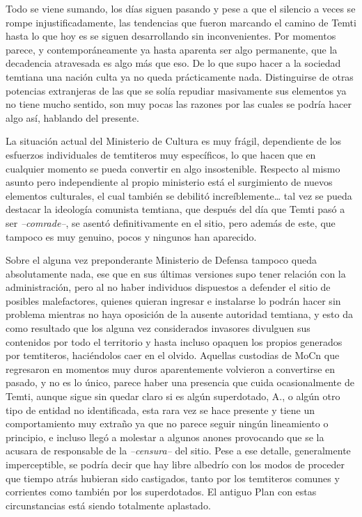 \documentclass[
  spanish,
]{book}
\begin{document}
Todo se viene sumando, los días siguen pasando y pese a que el silencio a veces se rompe injustificadamente, las tendencias que fueron marcando el camino de Temti hasta lo que hoy es se siguen desarrollando sin inconvenientes.
Por momentos parece, y contemporáneamente ya hasta aparenta ser algo permanente, que la decadencia atravesada es algo más que eso. De lo que supo hacer a la sociedad temtiana una nación culta ya no queda prácticamente nada. Distinguirse de otras potencias extranjeras de las que se solía repudiar masivamente sus elementos ya no tiene mucho sentido, son muy pocas las razones por las cuales se podría hacer algo así, hablando del presente.

La situación actual del Ministerio de Cultura es muy frágil, dependiente de los esfuerzos individuales de temtiteros muy específicos, lo que hacen que en cualquier momento se pueda convertir en algo insostenible. Respecto al mismo asunto pero independiente al propio ministerio está el surgimiento de nuevos elementos culturales, el cual también se debilitó increíblemente\ldots{} tal vez se pueda destacar la ideología comunista temtiana, que después del día que Temti pasó a ser \emph{--comrade--}, se asentó definitivamente en el sitio, pero además de este, que tampoco es muy genuino, pocos y ningunos han aparecido.

Sobre el alguna vez preponderante Ministerio de Defensa tampoco queda absolutamente nada, ese que en sus últimas versiones supo tener relación con la administración, pero al no haber individuos dispuestos a defender el sitio de posibles malefactores, quienes quieran ingresar e instalarse lo podrán hacer sin problema mientras no haya oposición de la ausente autoridad temtiana, y esto da como resultado que los alguna vez considerados invasores divulguen sus contenidos por todo el territorio y hasta incluso opaquen los propios generados por temtiteros, haciéndolos caer en el olvido. Aquellas custodias de MoCn que regresaron en momentos muy duros aparentemente volvieron a convertirse en pasado, y no es lo único, parece haber una presencia que cuida ocasionalmente de Temti, aunque sigue sin quedar claro si es algún superdotado, A., o algún otro tipo de entidad no identificada, esta rara vez se hace presente y tiene un comportamiento muy extraño ya que no parece seguir ningún lineamiento o principio, e incluso llegó a molestar a algunos anones provocando que se la acusara de responsable de la \emph{--censura--} del sitio. Pese a ese detalle, generalmente imperceptible, se podría decir que hay libre albedrío con los modos de proceder que tiempo atrás hubieran sido castigados, tanto por los temtiteros comunes y corrientes como también por los superdotados. El antiguo Plan con estas circunstancias está siendo totalmente aplastado.
\end{document}
